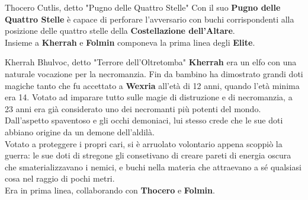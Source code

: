 \documentclass[10pt,twoside,onecolumn,openany]{book}
\begin{document}
\begin{multicols}{2}
\begin{paperbox}{{Thocero Cutlis, detto "Pugno delle Quattro Stelle"}}
	Con il suo \textbf{Pugno delle Quattro Stelle} è capace di perforare l'avversario con buchi corrispondenti alla posizione delle quattro stelle della \textbf{Costellazione dell'Altare}.\\
	Insieme a \textbf{Kherrah} e \textbf{Folmin} componeva la prima linea degli \textbf{Elite}.
\end{paperbox}
\begin{paperbox}{{Kherrah Bhulvoc, detto "Terrore dell'Oltretomba"}}
	\textbf{Kherrah} era un elfo con una naturale vocazione per la necromanzia. Fin da bambino ha dimostrato grandi doti magiche tanto che fu accettato a \textbf{Wexria} all'età di 12 anni, quando l'età minima era 14. Votato ad imparare tutto sulle magie di distruzione e di necromanzia, a 23 anni era già considerato uno dei necromanti più potenti del mondo. Dall'aspetto spaventoso e gli occhi demoniaci, lui stesso crede che le sue doti abbiano origine da un demone dell'aldilà.\\
	Votato a proteggere i propri cari, si è arruolato volontario appena scoppiò la guerra: le sue doti di stregone gli consetivano di creare pareti di energia oscura che smaterializzavano i nemici, e buchi nella materia che attraevano a sé qualsiasi cosa nel raggio di pochi metri.\\
	Era in prima linea, collaborando con \textbf{Thocero} e \textbf{Folmin}.
\end{paperbox}
\end{multicols}
\newpage
\end{document}
